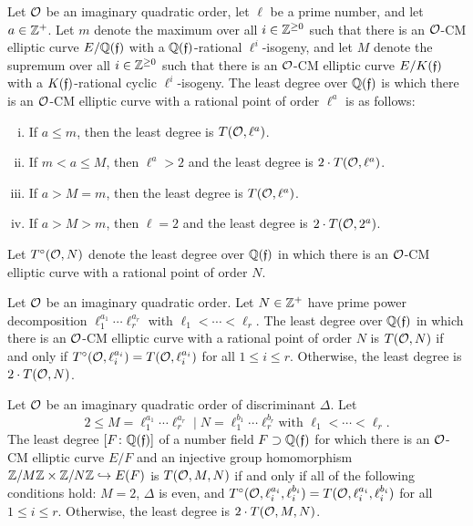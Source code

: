 \begin{thm}
Let $\mathcal{O}$ be an imaginary quadratic order, let $\ell$ be a prime number, and let $a \in \mathbb{Z}^+$. Let $m$ denote the maximum over all $i \in \mathbb{Z}^{\geq 0}$ such that there is an $\mathcal{O}$-CM elliptic curve $E/\mathbb{Q}(\mathfrak{f})$ with a $\mathbb{Q}(\mathfrak{f})$-rational $\ell^i$-isogeny, and let $M$ denote the supremum over all $i \in \mathbb{Z}^{\geq 0}$ such that there is an $\mathcal{O}$-CM elliptic curve $E/K(\mathfrak{f})$ with a $K(\mathfrak{f})$-rational cyclic $\ell^i$-isogeny. The least degree over $\mathbb{Q}(\mathfrak{f})$ is which there is an $\mathcal{O}$-CM elliptic curve with a rational point of order $\ell^a$ is as follows:
	\begin{enumerate}[(i)]
	\item If $a \leq m$, then the least degree is $T(\mathcal{O},\ell^a)$.
	\item If $m < a \leq M$, then $\ell^a > 2$ and the least degree is $2 \cdot T(\mathcal{O}, \ell^a)$.
	\item If $a > M= m$, then the least degree is $T(\mathcal{O}, \ell^a)$.
	\item If $a > M > m$, then $\ell= 2$ and the least degree is $2 \cdot T(\mathcal{O},2^a)$.
	\end{enumerate}
\end{thm}


Let $T^\circ(\mathcal{O},N)$ denote the least degree over $\mathbb{Q}(\mathfrak{f})$ in which there is an $\mathcal{O}$-CM elliptic curve with a rational point of order $N$. 


\begin{thm}
Let $\mathcal{O}$ be an imaginary quadratic order. Let $N \in \mathbb{Z}^+$ have prime power decomposition $\ell_1^{a_1} \cdots \ell_r^{a_r}$ with $\ell_1 < \cdots < \ell_r$. The least degree over $\mathbb{Q}(\mathfrak{f})$ in which there is an $\mathcal{O}$-CM elliptic curve with a rational point of order $N$ is $T(\mathcal{O},N)$ if and only if $T^\circ(\mathcal{O},\ell_i^{a_i})= T(\mathcal{O}, \ell_i^{a_i})$ for all $1 \leq i \leq r$. Otherwise, the least degree is $2 \cdot T(\mathcal{O},N)$. 
\end{thm}


\begin{thm}
Let $\mathcal{O}$ be an imaginary quadratic order of discriminant $\Delta$. Let 
	\[
	2 \leq M= \ell_1^{a_1} \cdots \ell_r^{a_r} \mid N= \ell_1^{b_1} \cdots \ell_r^{b_r} \text{with } \ell_1 < \cdots < \ell_r.
	\]
The least degree $[F \colon \mathbb{Q}(\mathfrak{f})]$ of a number field $F \supset \mathbb{Q}(\mathfrak{f})$ for which there is an $\mathcal{O}$-CM elliptic curve $E/F$ and an injective group homomorphism $\mathbb{Z}/M\mathbb{Z} \times \mathbb{Z}/N\mathbb{Z} \hookrightarrow E(F)$ is $T(\mathcal{O},M,N)$ if and only if all of the following conditions hold: $M= 2$, $\Delta$ is even, and $T^\circ(\mathcal{O}, \ell_i^{a_i}, \ell_i^{b_i})= T(\mathcal{O}, \ell_i^{a_i}, \ell_i^{b_i})$ for all $1 \leq i \leq r$. Otherwise, the least degree is $2 \cdot T(\mathcal{O},M,N)$. 
\end{thm}





